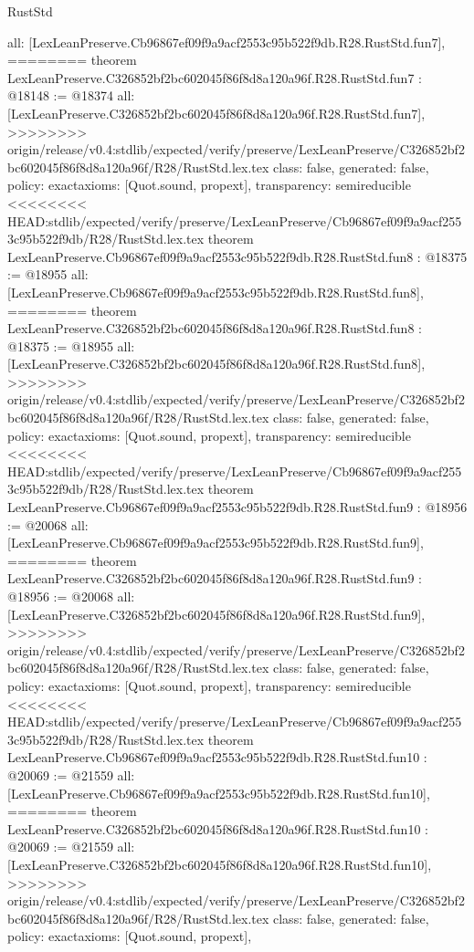 \begin{lexlean}{RustStd}
\begin{coremodule}
{\begin{coremodule}
{{{{{{{{{{  all: [LexLeanPreserve.Cb96867ef09f9a9acf2553c95b522f9db.R28.RustStd.fun7],
========
theorem LexLeanPreserve.C326852bf2bc602045f86f8d8a120a96f.R28.RustStd.fun7 : @18148 := @18374 {
  all: [LexLeanPreserve.C326852bf2bc602045f86f8d8a120a96f.R28.RustStd.fun7],
>>>>>>>> origin/release/v0.4:stdlib/expected/verify/preserve/LexLeanPreserve/C326852bf2bc602045f86f8d8a120a96f/R28/RustStd.lex.tex
  class: false,
  generated: false,
  policy: exact{axioms: [Quot.sound, propext]},
  transparency: semireducible
}
<<<<<<<< HEAD:stdlib/expected/verify/preserve/LexLeanPreserve/Cb96867ef09f9a9acf2553c95b522f9db/R28/RustStd.lex.tex
theorem LexLeanPreserve.Cb96867ef09f9a9acf2553c95b522f9db.R28.RustStd.fun8 : @18375 := @18955 {
  all: [LexLeanPreserve.Cb96867ef09f9a9acf2553c95b522f9db.R28.RustStd.fun8],
========
theorem LexLeanPreserve.C326852bf2bc602045f86f8d8a120a96f.R28.RustStd.fun8 : @18375 := @18955 {
  all: [LexLeanPreserve.C326852bf2bc602045f86f8d8a120a96f.R28.RustStd.fun8],
>>>>>>>> origin/release/v0.4:stdlib/expected/verify/preserve/LexLeanPreserve/C326852bf2bc602045f86f8d8a120a96f/R28/RustStd.lex.tex
  class: false,
  generated: false,
  policy: exact{axioms: [Quot.sound, propext]},
  transparency: semireducible
}
<<<<<<<< HEAD:stdlib/expected/verify/preserve/LexLeanPreserve/Cb96867ef09f9a9acf2553c95b522f9db/R28/RustStd.lex.tex
theorem LexLeanPreserve.Cb96867ef09f9a9acf2553c95b522f9db.R28.RustStd.fun9 : @18956 := @20068 {
  all: [LexLeanPreserve.Cb96867ef09f9a9acf2553c95b522f9db.R28.RustStd.fun9],
========
theorem LexLeanPreserve.C326852bf2bc602045f86f8d8a120a96f.R28.RustStd.fun9 : @18956 := @20068 {
  all: [LexLeanPreserve.C326852bf2bc602045f86f8d8a120a96f.R28.RustStd.fun9],
>>>>>>>> origin/release/v0.4:stdlib/expected/verify/preserve/LexLeanPreserve/C326852bf2bc602045f86f8d8a120a96f/R28/RustStd.lex.tex
  class: false,
  generated: false,
  policy: exact{axioms: [Quot.sound, propext]},
  transparency: semireducible
}
<<<<<<<< HEAD:stdlib/expected/verify/preserve/LexLeanPreserve/Cb96867ef09f9a9acf2553c95b522f9db/R28/RustStd.lex.tex
theorem LexLeanPreserve.Cb96867ef09f9a9acf2553c95b522f9db.R28.RustStd.fun10 : @20069 := @21559 {
  all: [LexLeanPreserve.Cb96867ef09f9a9acf2553c95b522f9db.R28.RustStd.fun10],
========
theorem LexLeanPreserve.C326852bf2bc602045f86f8d8a120a96f.R28.RustStd.fun10 : @20069 := @21559 {
  all: [LexLeanPreserve.C326852bf2bc602045f86f8d8a120a96f.R28.RustStd.fun10],
>>>>>>>> origin/release/v0.4:stdlib/expected/verify/preserve/LexLeanPreserve/C326852bf2bc602045f86f8d8a120a96f/R28/RustStd.lex.tex
  class: false,
  generated: false,
  policy: exact{axioms: [Quot.sound, propext]},
}}}}}}}}}}}}}}
\end{coremodule}}
\end{coremodule}
\end{lexlean}
